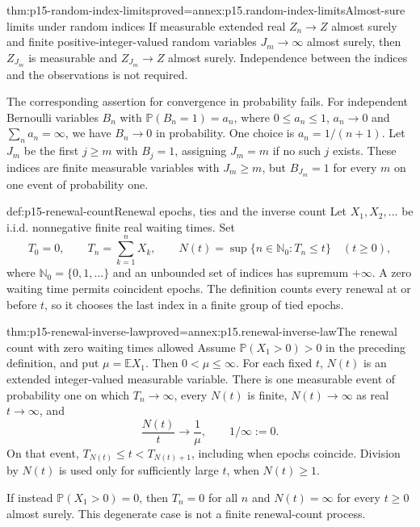\begin{hblemma}{thm:p15-random-index-limits}{proved=annex:p15.random-index-limits}{Almost-sure limits under random indices}
If measurable extended real \(Z_n\to Z\) almost surely and finite
positive-integer-valued random variables \(J_m\to\infty\) almost
surely, then \(Z_{J_m}\) is measurable and \(Z_{J_m}\to Z\) almost
surely. Independence between the indices and the observations is not
required.

The corresponding assertion for convergence in probability fails.
For independent Bernoulli variables \(B_n\) with
\(\mathbb P(B_n=1)=a_n\), where \(0\leq a_n\leq1\),
\(a_n\to0\) and \(\sum_na_n=\infty\), we have \(B_n\to0\)
in probability. One choice is \(a_n=1/(n+1)\).
Let \(J_m\) be the first \(j\geq m\) with \(B_j=1\), assigning
\(J_m=m\) if no such \(j\) exists. These indices are finite measurable
variables with \(J_m\geq m\), but \(B_{J_m}=1\) for every \(m\)
on one event of probability one.
\end{hblemma}

\begin{hbdefinition}{def:p15-renewal-count}{Renewal epochs, ties and the inverse count}
Let \(X_1,X_2,\ldots\) be i.i.d. nonnegative finite real waiting
times. Set
\[
 T_0=0,\qquad T_n=\sum_{k=1}^nX_k,\qquad
 N(t)=\sup\{n\in\mathbb N_0:T_n\leq t\}\quad(t\geq0),
\]
where \(\mathbb N_0=\{0,1,\ldots\}\) and an unbounded set of indices
has supremum \(+\infty\). A zero waiting time permits coincident
epochs. The definition counts every renewal at or before \(t\), so
it chooses the last index in a finite group of tied epochs.
\end{hbdefinition}

\begin{hbtheorem}{thm:p15-renewal-inverse-law}{proved=annex:p15.renewal-inverse-law}{The renewal count with zero waiting times allowed}
Assume \(\mathbb P(X_1>0)>0\) in the preceding definition, and put
\(\mu=\mathbb EX_1\). Then \(0<\mu\leq\infty\).
For each fixed \(t\), \(N(t)\) is an extended integer-valued
measurable variable. There is one measurable event of probability one
on which \(T_n\to\infty\), every \(N(t)\) is finite,
\(N(t)\to\infty\) as real \(t\to\infty\), and
\[
 \frac{N(t)}t\longrightarrow\frac1\mu,
 \qquad 1/\infty:=0.
\]
On that event,
\(T_{N(t)}\leq t<T_{N(t)+1}\), including when epochs coincide.
Division by \(N(t)\) is used only for sufficiently large \(t\),
when \(N(t)\geq1\).

If instead \(\mathbb P(X_1>0)=0\), then \(T_n=0\) for all \(n\)
and \(N(t)=\infty\) for every \(t\geq0\) almost surely. This
degenerate case is not a finite renewal-count process.
\end{hbtheorem}

